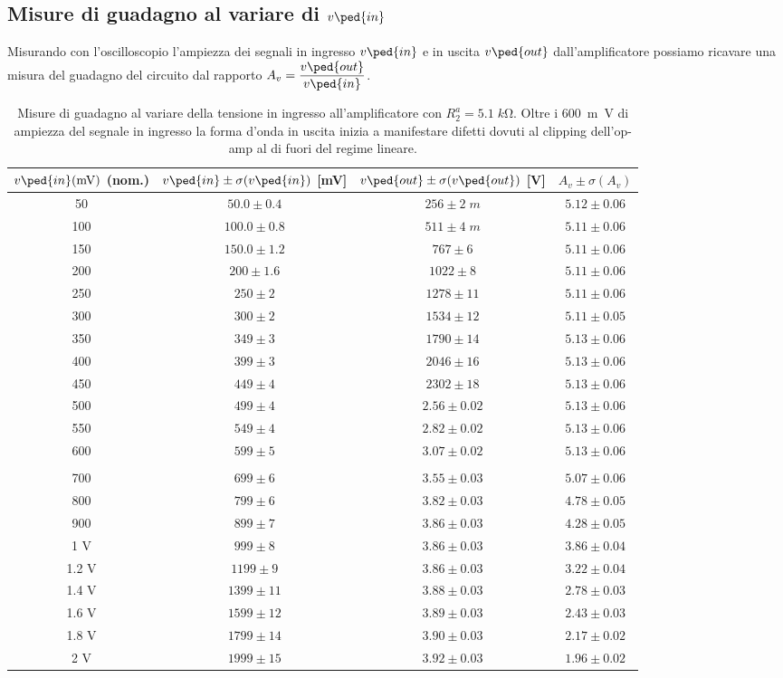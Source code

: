 \documentclass[10pt, a4paper, italian]{article}
\begin{document}
\subsection{Misure di guadagno al variare di $v\ped{in}$}
Misurando con l'oscilloscopio l'ampiezza dei segnali in ingresso $v\ped{in}$
e in uscita $v\ped{out}$ dall'amplificatore possiamo ricavare una misura del
guadagno del circuito dal rapporto $A_v = \dfrac{v\ped{out}}{v\ped{in}}$.
\begin{table}[htbp]
\centering
\begin{tabular}{cccc}
\toprule
$v\ped{in}(\si{m\V})$ (nom.) & $v\ped{in} \pm \sigma(v\ped{in})$ [mV] & $v\ped{out} \pm \sigma(v\ped{out})$ [V] & $A_v \pm \sigma(A_v)$ \\
\midrule
\midrule
50 & $50.0 \pm 0.4$ & $256 \pm 2 \; \si{m}$ & $5.12 \pm 0.06$ \\
100 & $100.0 \pm 0.8$ & $511 \pm 4 \; \si{m}$ & $5.11 \pm 0.06$ \\
150 & $150.0 \pm 1.2$ & $767 \pm 6$ & $5.11 \pm 0.06$ \\
200 & $200 \pm 1.6$ & $1022 \pm 8$ & $5.11 \pm 0.06$ \\
250 & $250 \pm 2$ & $1278 \pm 11$ & $5.11 \pm 0.06$ \\
300 & $300 \pm 2$ & $1534 \pm 12$ & $5.11 \pm 0.05$ \\
350 & $349 \pm 3$ & $1790 \pm 14$ & $5.13 \pm 0.06$ \\
400 & $399 \pm 3$ & $2046 \pm 16$ & $5.13 \pm 0.06$ \\
450 & $449 \pm 4$ & $2302 \pm 18$ & $5.13 \pm 0.06$ \\
500 & $499 \pm 4$ & $2.56 \pm 0.02$ & $5.13 \pm 0.06$ \\
550 & $549 \pm 4$ & $2.82 \pm 0.02$ & $5.13 \pm 0.06$ \\
600 & $599 \pm 5$ & $3.07 \pm 0.02$ & $5.13 \pm 0.06$ \\
\\
700 & $699 \pm 6$ & $3.55 \pm 0.03$ & $5.07 \pm 0.06$ \\
800 & $799 \pm 6$ & $3.82 \pm 0.03$ & $4.78 \pm 0.05$ \\
900 & $899 \pm 7$ & $3.86 \pm 0.03$ & $4.28 \pm 0.05$ \\
1 V & $999 \pm 8$ & $3.86 \pm 0.03$ & $3.86 \pm 0.04$ \\
1.2 V & $1199 \pm 9$ & $3.86 \pm 0.03$ & $3.22 \pm 0.04$ \\
1.4 V & $1399 \pm 11$ & $3.88 \pm 0.03$ & $2.78 \pm 0.03$ \\
1.6 V & $1599 \pm 12$ & $3.89 \pm 0.03$ & $2.43 \pm 0.03$ \\
1.8 V & $1799 \pm 14$ & $3.90 \pm 0.03$ & $2.17 \pm 0.02$ \\
2 V & $1999 \pm 15$ & $3.92 \pm 0.03$ & $1.96 \pm 0.02$ \\
\bottomrule
\end{tabular} 
\caption{Misure di guadagno al variare della tensione in ingresso
all'amplificatore con $R_2^a = 5.1 \; \si{k\ohm}$. Oltre i \SI{600}{m\V} di
ampiezza del segnale in ingresso la forma d'onda in uscita inizia a
manifestare difetti dovuti al clipping dell'op-amp al di fuori del regime
lineare. \label{tab: gain_B}}
\end{table}
\end{document}
